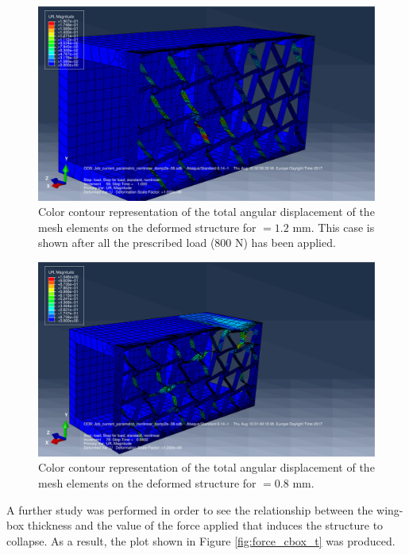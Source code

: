    \begin{figure}[!htpb] %
      \centering
      \includegraphics[width=0.8 \textwidth]{../figures/result-sim/cbox/1coma4-800N}
      \caption[Color contour representation of the total angular displacement of the mesh elements on the deformed structure for \boxt$ = 1.2$ mm]{Color contour representation of the total angular displacement of the mesh elements on the deformed structure for \boxt$ = 1.2$ mm. This case is shown after all the prescribed load (800 N) has been applied.}\label{fig:1coma2-800N-cbox_t}
    \end{figure}

    \begin{figure}[!htpb] %
      \centering
      \includegraphics[width=0.8 \textwidth]{../figures/result-sim/cbox/0coma8-800N-2}
      \caption[Color contour representation of the total angular displacement of the mesh elements on the deformed structure for \boxt$ = 0.8$ mm]{Color contour representation of the total angular displacement of the mesh elements on the deformed structure for \boxt$ = 0.8$ mm.}\label{fig:0coma8-800N-cbox_t}
    \end{figure}

    A further study was performed in order to see the relationship between the wing-box thickness and the value of the force applied that induces the structure to collapse. As a result, the plot shown in Figure \ref{fig:force_cbox_t} was produced.

